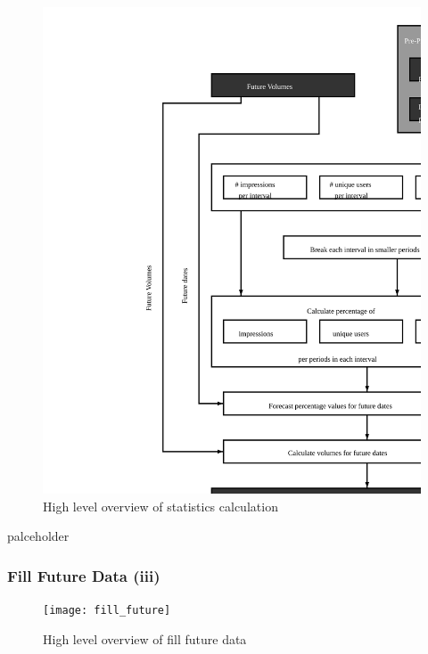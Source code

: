 \begin{figure}[h] \begin{center} \leavevmode
\includegraphics[]{calculate_stats} \caption{ High level overview
of statistics calculation} \label{fig:calculate_stats_ii} \end{center} \end{figure}

palceholder

\subsubsection{Fill Future Data (iii)}

\begin{figure}[h] \begin{center} \leavevmode
\texttt{[image: fill\_future]} \caption{ High level overview
of fill future data} \label{fig:fill_future_iii} \end{center} \end{figure}

